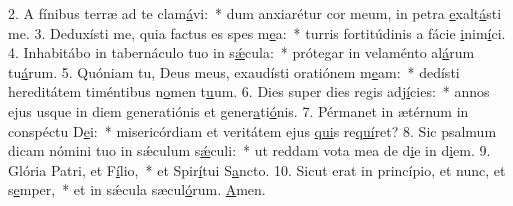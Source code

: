 2. A fínibus terræ ad te clam\uline{á}vi:~* dum anxiarétur cor meum, in petra \uline{e}xalt\uline{á}sti me.
3. Deduxísti me, quia factus es spes m\uline{e}a:~* turris fortitúdinis a fácie \uline{i}nim\uline{í}ci.
4. Inhabitábo in tabernáculo tuo in s\uline{ǽ}cula:~* prótegar in velaménto al\uline{á}rum tu\uline{á}rum.
5. Quóniam tu, Deus meus, exaudísti oratiónem m\uline{e}am:~* dedísti hereditátem timéntibus n\uline{o}men t\uline{u}um.
6. Dies super dies regis adj\uline{í}cies:~* annos ejus usque in diem generatiónis et gener\uline{a}ti\uline{ó}nis.
7. Pérmanet in ætérnum in conspéctu D\uline{e}i:~* misericórdiam et veritátem ejus \uline{qui}s re\uline{quí}ret?
8. Sic psalmum dicam nómini tuo in sǽculum s\uline{ǽ}culi:~* ut reddam vota mea de d\uline{i}e in d\uline{i}em.
9. Glória Patri, et F\uline{í}lio,~* et Spir\uline{í}tui S\uline{a}ncto.
10. Sicut erat in princípio, et nunc, et s\uline{e}mper,~* et in sǽcula sæcul\uline{ó}rum. \uline{A}men.
